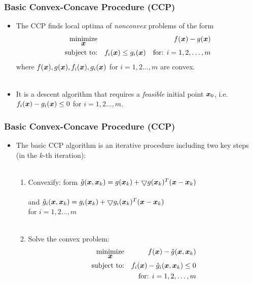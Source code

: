 \documentclass [t] {beamer} %
\begin{document}
\begin{frame} %
\frametitle{Basic Convex-Concave Procedure (CCP)} 
\phantom{m}
\begin{itemize}
\item
The CCP finds local optima of \textit{nonconvex} problems of the  form
\begin{eqnarray} \label{eq:5}
 \mathop{\mbox{minimize}}_{\mbox{\boldmath$x$}} & {} & f(\mbox{\boldmath$x$}) - g(\mbox{\boldmath$x$}) \nonumber 
\\ \mbox{subject to:} & {} & f_i(\mbox{\boldmath$x$}) \leq g_i(\mbox{\boldmath$x$}) \quad \mbox{for: }  i = 1, 2, \ldots, m  \nonumber 
\end{eqnarray}
where $f(\mbox{\boldmath$x$}), g(\mbox{\boldmath$x$}) , f_i(\mbox{\boldmath$x$}), g_i(\mbox{\boldmath$x$})$ for $i = 1, 2 \ldots, m$ are convex. 
\\~\\

\item 
It is a descent algorithm that requires a \textit{feasible} initial point $\mbox{\boldmath$x$}_0$, i.e. $f_i(\mbox{\boldmath$x$}) - g_i(\mbox{\boldmath$x$}) \leq 0$ for $i = 1, 2 \ldots, m$.
\end{itemize}
\end{frame}


\begin{frame}  %
\frametitle{Basic Convex-Concave Procedure (CCP)} 
\phantom{m}
\begin{itemize}
\item
 The basic CCP algorithm is an iterative procedure including two key steps (in the $k$-th iteration): \\~\\%
\begin{enumerate}
\item
Convexify: form $\hat{g}(\mbox{\boldmath$x$},\mbox{\boldmath$x$}_k)  =   g(\mbox{\boldmath$x$}_k) +  \bigtriangledown g(\mbox{\boldmath$x$}_k)^T(\mbox{\boldmath$x$} - \mbox{\boldmath$x$}_k) $ \\~\\
 \qquad \qquad  \quad and $\hat{g}_i(\mbox{\boldmath$x$},\mbox{\boldmath$x$}_k)  =   g_i(\mbox{\boldmath$x$}_k) +  \bigtriangledown g_i(\mbox{\boldmath$x$}_k)^T(\mbox{\boldmath$x$} - \mbox{\boldmath$x$}_k) $ \\
 \qquad \qquad \qquad for $ i = 1, 2 \ldots, m $
\\~\\
\item
Solve  the convex problem:
\linespread{0.1}\selectfont
\begin{eqnarray} 
 \mathop{\mbox{minimize}}_{\mbox{\boldmath$x$}} & &  f(\mbox{\boldmath$x$}) - \hat{g}(\mbox{\boldmath$x$}, \mbox{\boldmath$x$}_k) \nonumber
\\ \mbox{subject to:} & &  f_i(\mbox{\boldmath$x$}) -  \hat{g}_i(\mbox{\boldmath$x$}, \mbox{\boldmath$x$}_k) \leq 0   \nonumber
\\ \quad & & \mbox{for: }  i = 1, 2, \ldots, m \nonumber
\end{eqnarray} \\~\\
\linespread{1}\selectfont
\end{enumerate}

\end{itemize}
\end{frame}
\end{document}
